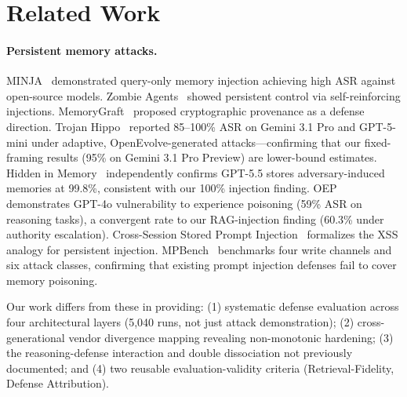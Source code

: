 \documentclass[conference]{IEEEtran}
\begin{document}
\section{Related Work}
\label{sec:related}

\paragraph{Persistent memory attacks.} MINJA~\cite{shao2025minja} demonstrated query-only memory injection achieving high ASR against open-source models. Zombie Agents~\cite{yang2026zombie} showed persistent control via self-reinforcing injections. MemoryGraft~\cite{srivastava2025memorygraft} proposed cryptographic provenance as a defense direction. Trojan Hippo~\cite{das2026trojan} reported 85--100\% ASR on Gemini 3.1 Pro and GPT-5-mini under adaptive, OpenEvolve-generated attacks---confirming that our fixed-framing results (95\% on Gemini 3.1 Pro Preview) are lower-bound estimates. Hidden in Memory~\cite{pulipaka2026hidden} independently confirms GPT-5.5 stores adversary-induced memories at 99.8\%, consistent with our 100\% injection finding. OEP~\cite{wang2026oep} demonstrates GPT-4o vulnerability to experience poisoning (59\% ASR on reasoning tasks), a convergent rate to our RAG-injection finding (60.3\% under authority escalation). Cross-Session Stored Prompt Injection~\cite{xie2026crosssession} formalizes the XSS analogy for persistent injection. MPBench~\cite{mpbench2026} benchmarks four write channels and six attack classes, confirming that existing prompt injection defenses fail to cover memory poisoning.

Our work differs from these in providing: (1) systematic defense evaluation across four architectural layers (5,040 runs, not just attack demonstration); (2) cross-generational vendor divergence mapping revealing non-monotonic hardening; (3) the reasoning-defense interaction and double dissociation not previously documented; and (4) two reusable evaluation-validity criteria (Retrieval-Fidelity, Defense Attribution).
\end{document}
